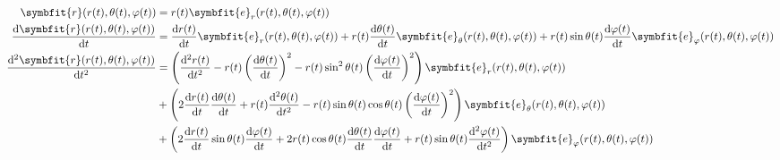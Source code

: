 \documentclass[12pt,oneside]{jlreq}
\newcommand{\bm}[1]{\symbfit{#1}}
\begin{document}
\begin{align*}
    \bm{r}(r(t),\theta(t),\varphi(t))&=r(t)\bm{e}_r(r(t),\theta(t),\varphi(t))\\
    \odv{\bm{r}(r(t),\theta(t),\varphi(t))}{t}&=\odv{r(t)}{t}\bm{e}_{r}(r(t),\theta(t),\varphi(t))+r(t)\odv{\theta(t)}{t}\bm{e}_{\theta}(r(t),\theta(t),\varphi(t))+r(t)\sin\theta(t)\odv{\varphi(t)}{t}\bm{e}_{\varphi}(r(t),\theta(t),\varphi(t))\\
    \odv[2]{\bm{r}(r(t),\theta(t),\varphi(t))}{t}&=\left(\odv[2]{r(t)}{t}-r(t)\left(\odv{\theta(t)}{t}\right)^2-r(t)\sin^2\theta(t)\left(\odv{\varphi(t)}{t}\right)^2\right)\bm{e}_r(r(t),\theta(t),\varphi(t))\\
    &+\left(2\odv{r(t)}{t}\odv{\theta(t)}{t}+r(t)\odv[2]{\theta(t)}{t}-r(t)\sin\theta(t)\cos\theta(t)\left(\odv{\varphi(t)}{t}\right)^2\right)\bm{e}_{\theta}(r(t),\theta(t),\varphi(t))\\
    &+\left(2\odv{r(t)}{t}\sin\theta(t)\odv{\varphi(t)}{t}+2r(t)\cos\theta(t)\odv{\theta(t)}{t}\odv{\varphi(t)}{t}+r(t)\sin\theta(t)\odv[2]{\varphi(t)}{t}\right)\bm{e}_{\varphi}(r(t),\theta(t),\varphi(t))
\end{align*}
\end{document}

